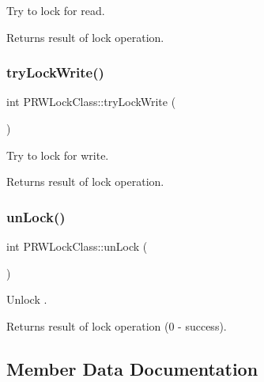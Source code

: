 Try to lock for read. \begin{DoxyReturn}{Returns}
result of lock operation. 
\end{DoxyReturn}
\mbox{\label{classPRWLockClass_aad1a8144616e233d02a12437a5f5d74f}} 
\subsubsection{\texorpdfstring{try\+Lock\+Write()}{tryLockWrite()}}
{\footnotesize\ttfamily int P\+R\+W\+Lock\+Class\+::try\+Lock\+Write (\begin{DoxyParamCaption}{ }\end{DoxyParamCaption})\hspace{0.3cm}{\ttfamily [inline]}}

Try to lock for write. \begin{DoxyReturn}{Returns}
result of lock operation. 
\end{DoxyReturn}
\mbox{\label{classPRWLockClass_a4b3f36ee6e3d4996e7b43ea6e4819144}} 
\subsubsection{\texorpdfstring{un\+Lock()}{unLock()}}
{\footnotesize\ttfamily int P\+R\+W\+Lock\+Class\+::un\+Lock (\begin{DoxyParamCaption}{ }\end{DoxyParamCaption})\hspace{0.3cm}{\ttfamily [inline]}}

Unlock . \begin{DoxyReturn}{Returns}
result of lock operation (0 -\/ success). 
\end{DoxyReturn}


\subsection{Member Data Documentation}
\mbox{\label{classPRWLockClass_aaa565eaea0c0e07a70fd6bdbb8f5693e}} 

